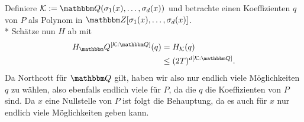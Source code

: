 \documentclass[ngerman,11pt,a4paper,titlepage]{article}
\newcommand{\Q}{\mathbbm Q}
\newcommand{\Z}{\mathbbm Z}
\newcommand{\K}{\mathcal{K}}
\begin{document}
Definiere $\K := \Q(\sigma_1(x),\ldots,\sigma_d(x))$ und betrachte einen Koeffizienten $q$ von $P$ als Polynom in $\Z [\sigma_1(x),\ldots,\sigma_d(x)]$.
\vspace{5mm}
\\*
Schätze nun $H$ ab mit
\begin{align*}
  H_\Q^{[\K : \Q]}(q) &= H_\K(q)\\
  &\leq (2T)^{d[\K : \Q]}.
\end{align*}
Da Northcott für $\Q$ gilt, haben wir also nur endlich viele Möglichkeiten $q$ zu wählen, also ebenfalls endlich viele für $P$, da die $q$ die Koeffizienten von $P$ sind. Da $x$ eine Nullstelle von $P$ ist folgt die Behauptung, da es auch für $x$ nur endlich viele Möglichkeiten geben kann.
\end{document}
